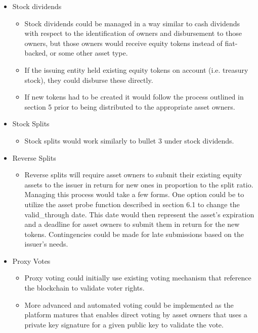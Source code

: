 \documentclass[12pt]{article}
\begin{document}
	\begin{itemize}
		\item{Stock dividends}
			\begin{itemize}
				\item{Stock dividends could be managed in a way similar to cash 
					dividends with respect to the identification of owners and 
					disbursement to those owners, but those owners would receive 
					equity tokens instead of fiat-backed, or some other asset type. }
				\item{If the issuing entity held existing equity tokens on account 
					(i.e. treasury stock), they could disburse these directly.}
				\item{If new tokens had to be created it would follow the process outlined 
					in section 5 prior to being distributed to the appropriate asset owners.}
			\end{itemize}
		\item{Stock Splits}
			\begin{itemize}
				\item{Stock splits would work similarly to bullet 3 under stock dividends.
					}
			\end{itemize}
		\item{Reverse Splits}
			\begin{itemize}
				\item{Reverse splits will require asset owners to submit their existing equity 
					assets to the issuer in return for new ones in proportion to the split 
					ratio. Managing this process would take a few forms. One option could be 
					to utilize the asset probe function described in section 6.1 to change the 
					valid\_through date. This date would then represent the asset’s expiration 
					and a deadline for asset owners to submit them in return for the new tokens. 
					Contingencies could be made for late submissions based on the issuer’s needs.}
			\end{itemize}
		\item{Proxy Votes}
			\begin{itemize}
				\item{Proxy voting could initially use existing voting mechanism that reference 
					the blockchain to validate voter rights.}
				\item{More advanced and automated voting could be implemented as the platform 
					matures that enables direct voting by asset owners that uses a private 
					key signature for a given public key to validate the vote.}
			\end{itemize}
	\end{itemize}
\end{document}
